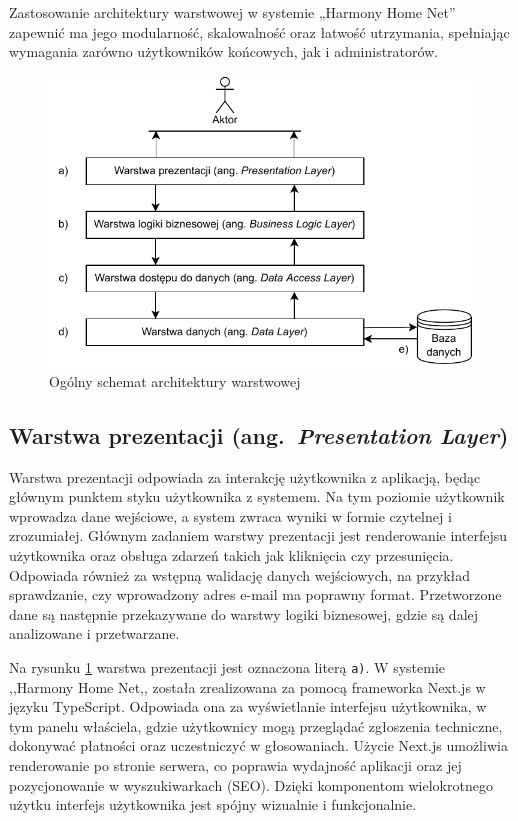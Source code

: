 Zastosowanie architektury warstwowej w systemie „Harmony Home Net” zapewnić ma jego modularność, skalowalność oraz łatwość utrzymania, spełniając wymagania zarówno użytkowników końcowych, jak i administratorów.
\begin{figure}[t]
    \centering
    \includegraphics[scale=1]{rys03/diagram_architektury_warstwowej}
    \caption{Ogólny schemat architektury warstwowej}
    \label{fig:n_tier_arch}
\end{figure}

\subsection{Warstwa prezentacji (ang.\ \emph{Presentation Layer})}
Warstwa prezentacji odpowiada za interakcję użytkownika z aplikacją, będąc głównym punktem styku użytkownika z systemem. Na tym poziomie użytkownik wprowadza dane wejściowe, a system zwraca wyniki w formie czytelnej i zrozumiałej. Głównym zadaniem warstwy prezentacji jest renderowanie interfejsu użytkownika oraz obsługa zdarzeń takich jak kliknięcia czy przesunięcia. Odpowiada również za wstępną walidację danych wejściowych, na przykład sprawdzanie, czy wprowadzony adres e-mail ma poprawny format. Przetworzone dane są następnie przekazywane do warstwy logiki biznesowej, gdzie są dalej analizowane i przetwarzane.

Na rysunku \ref{fig:n_tier_arch} warstwa prezentacji jest oznaczona literą \texttt{a)}. W systemie ,,Harmony Home Net,, została zrealizowana za pomocą frameworka Next.js w języku TypeScript. Odpowiada ona za wyświetlanie interfejsu użytkownika, w tym panelu właściela, gdzie użytkownicy mogą przeglądać zgłoszenia techniczne, dokonywać płatności oraz uczestniczyć w głosowaniach. Użycie Next.js umożliwia renderowanie po stronie serwera, co poprawia wydajność aplikacji oraz jej pozycjonowanie w wyszukiwarkach (SEO). Dzięki komponentom wielokrotnego użytku interfejs użytkownika jest spójny wizualnie i funkcjonalnie. 

